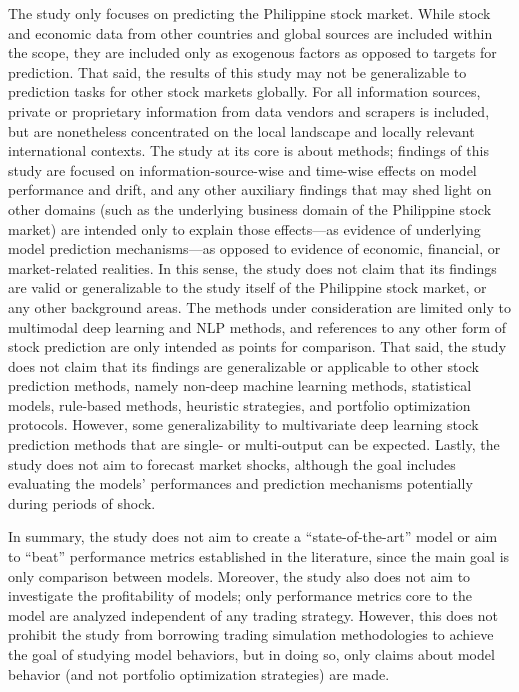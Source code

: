 \documentclass[stu,floatsintext]{apa7}
\begin{document}
The study only focuses on predicting the Philippine stock market. While stock and economic data from other countries and global sources are included within the scope, they are included only as exogenous factors as opposed to targets for prediction. That said, the results of this study may not be generalizable to prediction tasks for other stock markets globally. For all information sources, private or proprietary information from data vendors and scrapers is included, but are nonetheless concentrated on the local landscape and locally relevant international contexts. The study at its core is about methods; findings of this study are focused on information-source-wise and time-wise effects on model performance and drift, and any other auxiliary findings that may shed light on other domains (such as the underlying business domain of the Philippine stock market) are intended only to explain those effects—as evidence of underlying model prediction mechanisms—as opposed to evidence of economic, financial, or market-related realities. In this sense, the study does not claim that its findings are valid or generalizable to the study itself of the Philippine stock market, or any other background areas. The methods under consideration are limited only to multimodal deep learning and NLP methods, and references to any other form of stock prediction are only intended as points for comparison. That said, the study does not claim that its findings are generalizable or applicable to other stock prediction methods, namely non-deep machine learning methods, statistical models, rule-based methods, heuristic strategies, and portfolio optimization protocols. However, some generalizability to multivariate deep learning stock prediction methods that are single- or multi-output can be expected. Lastly, the study does not aim to forecast market shocks, although the goal includes evaluating the models’ performances and prediction mechanisms potentially during periods of shock.

In summary, the study does not aim to create a ``state-of-the-art'' model or aim to ``beat'' performance metrics established in the literature, since the main goal is only comparison between models. Moreover, the study also does not aim to investigate the profitability of models; only performance metrics core to the model are analyzed independent of any trading strategy. However, this does not prohibit the study from borrowing trading simulation methodologies to achieve the goal of studying model behaviors, but in doing so, only claims about model behavior (and not portfolio optimization strategies) are made.
\end{document}

